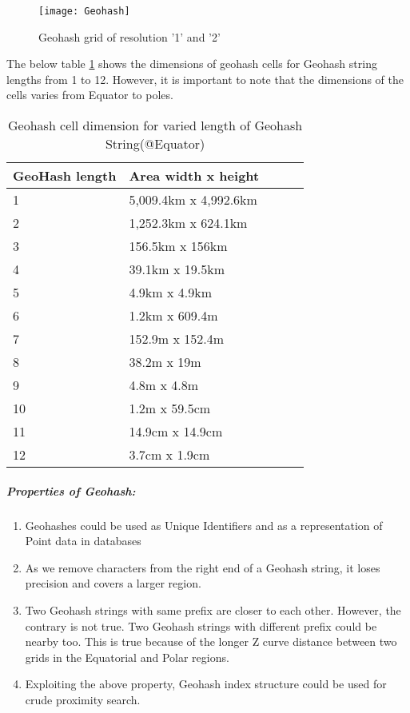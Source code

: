 \documentclass[article,type=msc,colorback,12pt,accentcolor=tud1d]{tudthesis}
\begin{document}
				\begin{figure}[h]
				\centering
				\texttt{[image: Geohash]}
				\caption{Geohash grid of resolution '1' and '2'}
				\label{fig:Geohash}
				\end{figure}
						   
		   \clearpage
		   The below table \ref{tab:Geohash_Resolution} shows the dimensions of geohash cells for Geohash string lengths from 1 to 12. However, it is important to note that the dimensions of the cells varies from Equator to poles. 
		   \cite{elastic_geohash}
		   
		   \begin{table}[h]
		   	\centering
		   	\begin{tabular}[htbp]{llllc}
		   		\\	\hline 
		   		
		   		\textbf{GeoHash length}			&\textbf{Area width x height}  \\
		   		\hline
		   		1				&5,009.4km x 4,992.6km \\
		   		2				&1,252.3km x 624.1km \\
		   		3				&156.5km x 156km \\
		   		4				&39.1km x 19.5km \\
		   		5				&4.9km x 4.9km \\
		   		6				&1.2km x 609.4m \\
		   		7				&152.9m x 152.4m \\
		   		8				&38.2m x 19m \\
		   		9				&4.8m x 4.8m \\
		   		10				&1.2m x 59.5cm \\
		   		11				&14.9cm x 14.9cm \\
		   		12				&3.7cm x 1.9cm \\
		   		
		   		\hline
		   	\end{tabular}
		   	\caption{Geohash cell dimension for varied length of Geohash String(@Equator)}
		   	\label{tab:Geohash_Resolution}
		   \end{table}
		   
		   \subparagraph{Properties of Geohash: } \cite{Geohash}
		   \begin{enumerate}
		   	\item Geohashes could be used as Unique Identifiers and as a representation of Point data in databases \cite{wiki:geohash}
		   \item As we remove characters from the right end of a Geohash string, it loses precision and covers a larger region.
		   \item Two Geohash strings with same prefix are closer to each other. However, the contrary is not true. Two Geohash strings with different prefix could be nearby too. This is true because of the longer Z curve distance between two grids in the Equatorial and Polar regions.
		   		   \item Exploiting the above property, Geohash index structure could be used for crude proximity search.
		   
		   \end{enumerate}
		   
\end{document}
